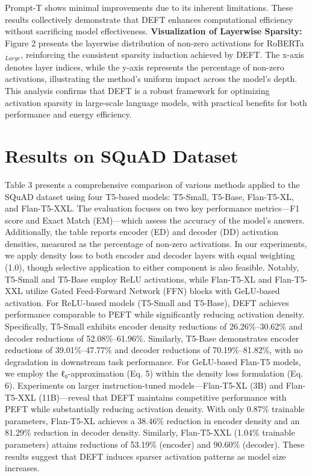 \documentclass[11pt,a4paper]{article}
\begin{document}
Prompt-T shows minimal improvements due to its inherent limitations. These results collectively demonstrate that DEFT enhances computational efficiency without sacrificing model effectiveness. \textbf{Visualization of Layerwise Sparsity:} Figure 2 presents the layerwise distribution of non-zero activations for RoBERTa\(_{Large}\), reinforcing the consistent sparsity induction achieved by DEFT. The x-axis denotes layer indices, while the y-axis represents the percentage of non-zero activations, illustrating the method's uniform impact across the model's depth. This analysis confirms that DEFT is a robust framework for optimizing activation sparsity in large-scale language models, with practical benefits for both performance and energy efficiency.




\section{Results on SQuAD Dataset}

Table 3 presents a comprehensive comparison of various methods applied to the SQuAD dataset using four T5-based models: T5-Small, T5-Base, Flan-T5-XL, and Flan-T5-XXL. The evaluation focuses on two key performance metrics—F1 score and Exact Match (EM)—which assess the accuracy of the model's answers. Additionally, the table reports encoder (ED) and decoder (DD) activation densities, measured as the percentage of non-zero activations. In our experiments, we apply density loss to both encoder and decoder layers with equal weighting (1.0), though selective application to either component is also feasible. Notably, T5-Small and T5-Base employ ReLU activations, while Flan-T5-XL and Flan-T5-XXL utilize Gated Feed-Forward Network (FFN) blocks with GeLU-based activation. For ReLU-based models (T5-Small and T5-Base), DEFT achieves performance comparable to PEFT while significantly reducing activation density. Specifically, T5-Small exhibits encoder density reductions of 26.26\%–30.62\% and decoder reductions of 52.08\%–61.96\%. Similarly, T5-Base demonstrates encoder reductions of 39.01\%–47.77\% and decoder reductions of 70.19\%–81.82\%, with no degradation in downstream task performance. For GeLU-based Flan-T5 models, we employ the ℓ₀-approximation (Eq. 5) within the density loss formulation (Eq. 6). Experiments on larger instruction-tuned models—Flan-T5-XL (3B) and Flan-T5-XXL (11B)—reveal that DEFT maintains competitive performance with PEFT while substantially reducing activation density. With only 0.87\% trainable parameters, Flan-T5-XL achieves a 38.46\% reduction in encoder density and an 81.29\% reduction in decoder density. Similarly, Flan-T5-XXL (1.04\% trainable parameters) attains reductions of 53.19\% (encoder) and 90.60\% (decoder). These results suggest that DEFT induces sparser activation patterns as model size increases.
\end{document}
